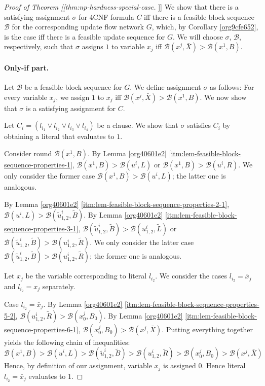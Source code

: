 \documentclass[fontsize=11pt,paper=a4]{book}
\begin{document}
\begin{proof}[Proof of Theorem [[thm:np-hardness-special-case]]]
We show that there is a satisfying assignment \(\sigma\) for 4CNF formula \(C\) iff there is a feasible block sequence \(\mathcal{B}\) for the corresponding update flow network \(G\), which, by Corollary \ref{org9cfe652}, is the case iff there is a feasible update sequence for \(G\).
We will choose \(\sigma\), \(\mathcal{B}\), respectively, such that \(\sigma\) assigns \(1\) to variable \(x_j\) iff \(\mathcal{B}(x^j,\bar{X})>\mathcal{B}(x^1,B)\).

\paragraph{Only-if part.}
Let \(\mathcal{B}\) be a feasible block sequence for \(G\).
We define assignment \(\sigma\) as follows:
For every variable \(x_j\), we assign \(1\) to \(x_j\) iff \(\mathcal{B}(x^j,\bar{X})>\mathcal{B}(x^1,B)\).
We now show that \(\sigma\) is a satisfying assignment for \(C\).

Let \(C_i=(l_{i_1}\vee l_{i_2}\vee l_{i_3}\vee l_{i_4})\) be a clause.
We show that \(\sigma\) satisfies \(C_i\) by obtaining a literal that evaluates to \(1\).

Consider round \(\mathcal{B}(x^1,B)\).
By Lemma \ref{org40601e2} \ref{itm:lem-feasible-block-sequence-properties-1}, \(\mathcal{B}(x^1,B)>\mathcal{B}(u^i,L)\) or \(\mathcal{B}(x^1,B)>\mathcal{B}(u^i,R)\).
We only consider the former case \(\mathcal{B}(x^1,B)>\mathcal{B}(u^i,L)\); the latter one is analogous.

By Lemma \ref{org40601e2} \ref{itm:lem-feasible-block-sequence-properties-2-1}, \(\mathcal{B}(u^i,L)>\mathcal{B}(\tilde{u}_{1,2}^i,\tilde{B})\).
By Lemma \ref{org40601e2} \ref{itm:lem-feasible-block-sequence-properties-3-1}, \(\mathcal{B}(\tilde{u}_{1,2}^i,\tilde{B})>\mathcal{B}(u_{1,2}^i,\tilde{L})\) or \(\mathcal{B}(\tilde{u}_{1,2}^i,\tilde{B})>\mathcal{B}(u_{1,2}^i,\tilde{R})\).
We only consider the latter case \(\mathcal{B}(\tilde{u}_{1,2}^i,\tilde{B})>\mathcal{B}(u_{1,2}^i,\tilde{R})\); the former one is analogous.

Let \(x_j\) be the variable corresponding to literal \(l_{i_2}\).
We consider the cases \(l_{i_2}=\bar{x}_j\) and \(l_{i_2}=x_j\) separately.

Case \(l_{i_2}=\bar{x}_j\).
By Lemma \ref{org40601e2} \ref{itm:lem-feasible-block-sequence-properties-5-2}, \(\mathcal{B}(u_{1,2}^i,\tilde{R})>\mathcal{B}(x_0^j,B_0)\).
By Lemma \ref{org40601e2} \ref{itm:lem-feasible-block-sequence-properties-6-1}, \(\mathcal{B}(x_0^j,B_0)>\mathcal{B}(x^j,\bar{X})\).
Putting everything together yields the following chain of inequalities:
\[
\mathcal{B}(x^1,B)>
\mathcal{B}(u^i,L)>
\mathcal{B}(\tilde{u}_{1,2}^i,\tilde{B})>
\mathcal{B}(u_{1,2}^i,\tilde{R})>
\mathcal{B}(x_0^j,B_0)>
\mathcal{B}(x^j,\bar{X})
\]
Hence, by definition of our assignment, variable \(x_j\) is assigned \(0\).
Hence literal \(l_{i_2}=\bar{x}_j\) evaluates to \(1\).


\end{proof}
\end{document}
